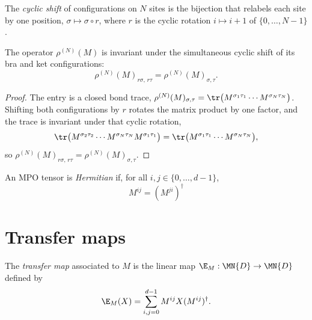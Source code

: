 \begin{definition}\label{def:mpo_rotate_config}
    \leanok
    The \emph{cyclic shift} of configurations on $N$ sites is the bijection that
    relabels each site by one position, $\sigma \mapsto \sigma \circ r$, where
    $r$ is the cyclic rotation $i \mapsto i + 1$ of $\{0,\ldots,N-1\}$.
\end{definition}

\begin{theorem}
    \label{thm:mpo_translation_invariant}
    \leanok
    The operator $\rho^{(N)}(M)$ is invariant under the simultaneous cyclic shift
    of its bra and ket configurations:
    \[
        \rho^{(N)}(M)_{r\sigma,\, r\tau} = \rho^{(N)}(M)_{\sigma,\tau}.
    \]
\end{theorem}

\begin{proof}\leanok
    The entry is a closed bond trace,
    $\rho^{(N)}(M)_{\sigma,\tau}
        = \tr\bigl(M^{\sigma_1\tau_1} \cdots M^{\sigma_N\tau_N}\bigr)$.
    Shifting both configurations by $r$ rotates the matrix product by one factor,
    and the trace is invariant under that cyclic rotation,
    \[
        \tr\bigl(M^{\sigma_2\tau_2} \cdots M^{\sigma_N\tau_N} M^{\sigma_1\tau_1}\bigr)
        = \tr\bigl(M^{\sigma_1\tau_1} \cdots M^{\sigma_N\tau_N}\bigr),
    \]
    so $\rho^{(N)}(M)_{r\sigma,\,r\tau} = \rho^{(N)}(M)_{\sigma,\tau}$.
\end{proof}

\begin{definition}\label{def:mpo_hermitian}
    \leanok
    An MPO tensor is \emph{Hermitian} if, for all
    $i,j \in \{0,\ldots,d{-}1\}$,
    \[
        M^{ij} = (M^{ji})^\dagger
    \]
\end{definition}

\section{Transfer maps}

\begin{definition}\label{def:mpo_transfer_map}
    \leanok
    The \emph{transfer map} associated to $M$ is the linear map
    $\E_M : \MN{D} \to \MN{D}$ defined by
    \[
        \E_M(X) = \sum_{i,j=0}^{d-1} M^{ij} X (M^{ij})^\dagger.
    \]
\end{definition}

